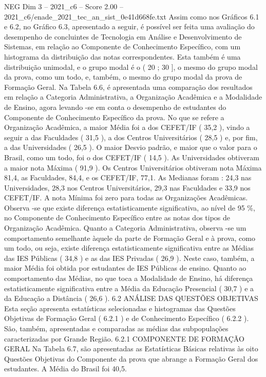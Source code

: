 \begin{textsample}{NEG Dim 3 – 2021\_c6 – Score 2.00 – 2021\_c6/enade\_2021\_tec\_an\_sist\_0e41d668fe.txt}
Assim como nos Gráficos 6.1 e 6.2, no Gráfico 6.3, apresentado a seguir, é possível ser feita uma avaliação do desempenho de concluintes de Tecnologia em Análise e Desenvolvimento de Sistemas, em relação ao Componente de Conhecimento Específico, com um histograma da distribuição das notas correspondentes.
Esta também é uma distribuição unimodal, e o grupo modal é o ( 20 ; 30 ], o mesmo do grupo modal da prova, como um todo, e, também, o mesmo do grupo modal da prova de Formação Geral.
Na Tabela 6.6, é apresentada uma comparação dos resultados em relação a Categoria Administrativa, a Organização Acadêmica e a Modalidade de Ensino, agora levando -se em conta o desempenho de estudantes do Componente de Conhecimento Específico da prova.
No que se refere a Organização Acadêmica, a maior Média foi a dos CEFET/IF ( 35,2 ), vindo a seguir a das Faculdades ( 31,5 ), a dos Centros Universitários ( 28,5 ) e, por fim, a das Universidades ( 26,5 ).
O maior Desvio padrão, e maior que o valor para o Brasil, como um todo, foi o dos CEFET/IF ( 14,5 ).
As Universidades obtiveram a maior nota Máxima ( 91,9 ).
Os Centros Universitários obtiveram nota Máxima 81,4, as Faculdades, 84,4, e os CEFET/IF, 77,1.
As Medianas foram : 24,3 nas Universidades, 28,3 nos Centros Universitários, 29,3 nas Faculdades e 33,9 nos CEFET/IF.
A nota Mínima foi zero para todas as Organizações Acadêmicas.
Observa -se que existe diferença estatisticamente significativa, ao nível de 95 \%, no Componente de Conhecimento Específico entre as notas dos tipos de Organização Acadêmica.
Quanto a Categoria Administrativa, observa -se um comportamento semelhante àquele da parte de Formação Geral e à prova, como um todo, ou seja, existe diferença estatisticamente significativa entre as Médias das IES Públicas ( 34,8 ) e as das IES Privadas ( 26,9 ).
Neste caso, também, a maior Média foi obtida por estudantes de IES Públicas de ensino.
Quanto ao comportamento das Médias, no que toca a Modalidade de Ensino, há diferença estatisticamente significativa entre a Média da Educação Presencial ( 30,7 ) e a da Educação a Distância ( 26,6 ). 6.2 ANÁLISE DAS QUESTÕES OBJETIVAS Esta seção apresenta estatísticas selecionadas e histogramas das Questões Objetivas de Formação Geral ( 6.2.1 ) e de Conhecimento Específico ( 6.2.2 ).
São, também, apresentadas e comparadas as médias das subpopulações caracterizadas por Grande Região. 6.2.1 COMPONENTE DE FORMAÇÃO GERAL Na Tabela 6.7, são apresentadas as Estatísticas Básicas relativas às oito Questões Objetivas do Componente da prova que abrange a Formação Geral dos estudantes.
A Média do Brasil foi 40,5.

\end{textsample}
